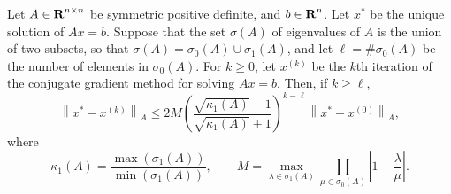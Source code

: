 \documentclass{homework}
\newcommand{\pow}[1]{^{\left(#1\right)}}
\newcommand{\norm}[1]{\left\lVert{#1}\right\rVert}
\begin{document}
	\question Let $A \in \textbf{R}^{n\times n}$ be symmetric positive definite, and $b \in \textbf{R}^n$. Let $x^*$ be the unique solution of $Ax = b$. Suppose that the set $\sigma(A)$ of eigenvalues of $A$ is the union of two subsets, so that $\sigma(A) = \sigma_0(A) \cup \sigma_1(A)$, and let $\ell = \#\sigma_0(A)$ be the number of elements in $\sigma_0(A)$. For $k \ge 0$, let $x\pow{k}$ be the $k$th iteration of the conjugate gradient method for solving $Ax = b$. Then, if $k \ge \ell$,
	\begin{equation*}
		\norm{x^* - x\pow{k}}_A \le 2M\left(\frac{\sqrt{\kappa_1(A)}-1}{\sqrt{\kappa_1(A)}+1}\right)^{k-\ell}\norm{x^* - x\pow{0}}_A,
	\end{equation*}
	where
	\begin{equation*}
		\kappa_1(A) = \frac{\max(\sigma_1(A))}{\min(\sigma_1(A))}, \qquad M = \max_{\lambda \in \sigma_1(A)}\prod_{\mu \in \sigma_0(A)}\left|1-\frac{\lambda}{\mu}\right|.
	\end{equation*}
\end{document}
